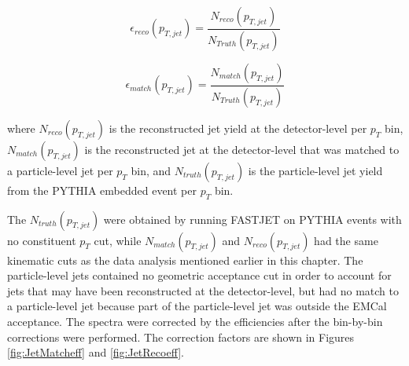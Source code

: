 \begin{equation}
 \epsilon_{reco} (p_{T, jet}) = \frac{N_{reco}(p_{T, jet}) }{N_{Truth} (p_{T, jet})}
\label{eq:jetrecoeff}
\end{equation}

\begin{equation}
 \epsilon_{match} (p_{T, jet}) = \frac{N_{match}(p_{T, jet}) }{N_{Truth}(p_{T, jet})}
\label{eq:jetmatchoeff}
\end{equation}


\noindent 
where $N_{reco} (p_{T, jet})$ is the reconstructed jet yield at the detector-level per $p_{T}$ bin, $N_{match}(p_{T, jet})$ is the reconstructed jet at the detector-level that was matched to a particle-level jet per $p_{T}$ bin, and $N_{truth} (p_{T, jet})$ is the particle-level jet yield from the PYTHIA embedded event per $p_{T}$ bin.  

The $N_{truth} (p_{T, jet})$ were obtained by running FASTJET on PYTHIA events with no constituent $p_{T}$ cut, while $N_{match}(p_{T, jet})$ and $N_{reco} (p_{T, jet})$ had the same kinematic cuts as the data analysis mentioned earlier in this chapter.  The particle-level jets contained no geometric acceptance cut in order to account for jets that may have been reconstructed at the detector-level, but had no match to a particle-level jet because part of the particle-level jet was outside the EMCal acceptance.  The spectra were corrected by the efficiencies after the bin-by-bin corrections were performed.  The correction factors are shown in Figures \ref{fig:JetMatcheff} and \ref{fig:JetRecoeff}.


